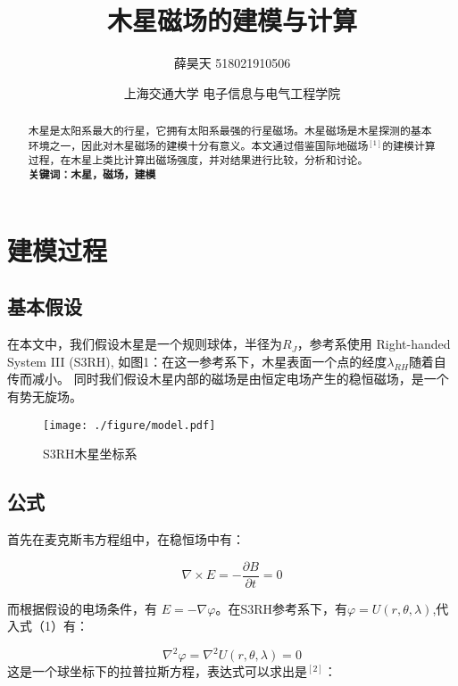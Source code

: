 \documentclass{article}
\begin{document}
\title{木星磁场的建模与计算}
\author{薛昊天 518021910506}
\date{\small{上海交通大学 电子信息与电气工程学院}}
\maketitle
\begin{abstract}
   木星是太阳系最大的行星，它拥有太阳系最强的行星磁场。木星磁场是木星探测的基本环境之一，因此对木星磁场的建模十分有意义。本文通过借鉴国际地磁场$^{[1]}$的建模计算过程，在木星上类比计算出磁场强度，并对结果进行比较，分析和讨论。\\
  \textbf{关键词：木星，磁场，建模}
  
\end{abstract}




\section{建模过程}
 \subsection{基本假设}
   在本文中，我们假设木星是一个规则球体，半径为$R_J$，参考系使用 Right-handed System III
   (S3RH), 如图1：在这一参考系下，木星表面一个点的经度$\lambda_{RH}$随着自传而减小。
   同时我们假设木星内部的磁场是由恒定电场产生的稳恒磁场，是一个有势无旋场。
   
\begin{figure}
    \centering
    \texttt{[image: ./figure/model.pdf]}
    \caption{S3RH木星坐标系}
    \label{fig:my_label}
\end{figure}   

   \subsection{公式}
   首先在麦克斯韦方程组中，在稳恒场中有：
   
   \begin{equation} 
       \nabla \times E = -\frac{\partial{B}}{\partial{t}}=0 
   \end{equation}

   而根据假设的电场条件，有 $E=-\nabla{\varphi}$。在S3RH参考系下，有$\varphi=U(r,\theta,\lambda)$,代入式（1）有：
   
   \begin{equation} 
       \nabla^{2}\varphi=\nabla^{2}U(r,\theta,\lambda)=0
   \end{equation}
   这是一个球坐标下的拉普拉斯方程，表达式可以求出是$^{[2]}$：
\end{document}
